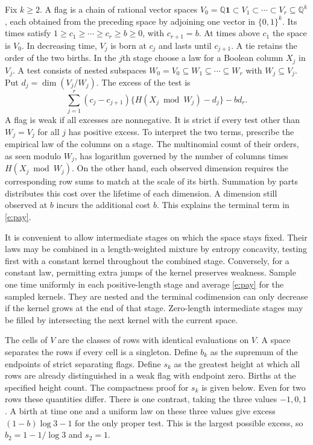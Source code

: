 \documentclass[11pt]{article}
\numberwithin{equation}{section}
\newcommand{\Q}{\mathbb Q}
\newcommand{\one}{\mathbf 1}
\begin{document}
Fix $k\ge2$. A flag is a chain of rational vector spaces
$V_0=\Q\one\subset V_1\subset\cdots\subset V_r\subseteq\Q^k$,
each obtained from the preceding space by adjoining one vector in
$\{0,1\}^k$. Its times satisfy $1\ge c_1\ge\cdots\ge c_r\ge b\ge0$,
with $c_{r+1}=b$. At times above $c_1$ the space is $V_0$.
In decreasing time, $V_j$ is born at $c_j$ and lasts until $c_{j+1}$.
A tie retains the order of the two births. In the $j$th stage choose
a law for a Boolean column $X_j$ in $V_j$. A test consists of
nested subspaces $W_0=V_0\subseteq W_1\subseteq\cdots\subseteq W_r$
with $W_j\subseteq V_j$. Put $d_j=\dim(V_j/W_j)$. The excess of
the test is
\begin{equation}
 \sum_{j=1}^r(c_j-c_{j+1})\{H(X_j\bmod W_j)-d_j\}-b d_r .
 \label{e:pay}
\end{equation}
A flag is weak if all excesses are nonnegative. It is strict if
every test other than $W_j=V_j$ for all $j$ has positive excess.
To interpret the two terms, prescribe the empirical law of the
columns on a stage. The multinomial count of their orders, as seen
modulo $W_j$, has logarithm governed by the number of columns times
$H(X_j\bmod W_j)$. On the other hand, each observed dimension
requires the corresponding row sums to match at the scale of its
birth. Summation by parts distributes this cost over the lifetime
of each dimension. A dimension still observed at $b$ incurs the
additional cost $b$. This explains the terminal term in \eqref{e:pay}.

It is convenient to allow intermediate stages on which the space
stays fixed. Their laws may be combined in a length-weighted mixture
by entropy concavity, testing first with a constant kernel throughout
the combined stage. Conversely, for a constant law, permitting extra
jumps of the kernel preserves weakness. Sample one time uniformly
in each positive-length stage and average \eqref{e:pay} for the
sampled kernels. They are nested and the terminal codimension can only decrease if the kernel grows at the
end of that stage. Zero-length intermediate
stages may be filled by intersecting the next kernel with the current
space.

The cells of $V$ are the classes of rows with identical evaluations
on $V$. A space separates the rows if every cell is a singleton.
Define $b_k$ as the supremum of the endpoints of strict separating
flags. Define $s_k$ as the greatest height at which all rows are
already distinguished in a weak flag with endpoint zero. Births at
the specified height count. The compactness proof for $s_k$ is given
below. Even for two rows these quantities differ. There is one
contrast, taking the three values $-1,0,1$. A birth at time one
and a uniform law on these three values give excess
$(1-b)\log3-1$ for the only proper test. This is the largest
possible excess, so $b_2=1-1/\log3$ and $s_2=1$.
\end{document}
